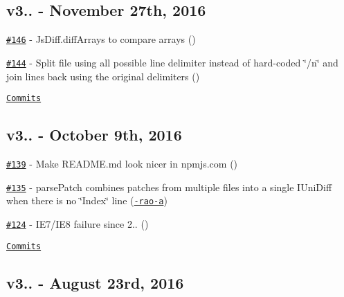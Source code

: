 \subsection*{v3.. -\/ November 27th, 2016}


\begin{DoxyItemize}
\item \href{https://github.com/kpdecker/jsdiff/pull/146}{\tt \#146} -\/ Js\+Diff.\+diff\+Arrays to compare arrays (\href{https://api.github.com/users/wvanderdeijl}{\tt })
\item \href{https://github.com/kpdecker/jsdiff/pull/144}{\tt \#144} -\/ Split file using all possible line delimiter instead of hard-\/coded \char`\"{}/n\char`\"{} and join lines back using the original delimiters (\href{https://api.github.com/users/soulbeing}{\tt })
\end{DoxyItemize}

\href{https://github.com/kpdecker/jsdiff/compare/v3.0.1...v3.1.0}{\tt Commits}

\subsection*{v3.. -\/ October 9th, 2016}


\begin{DoxyItemize}
\item \href{https://github.com/kpdecker/jsdiff/pull/139}{\tt \#139} -\/ Make R\+E\+A\+D\+M\+E.\+md look nicer in npmjs.\+com (\href{https://api.github.com/users/takenspc}{\tt })
\item \href{https://github.com/kpdecker/jsdiff/issues/135}{\tt \#135} -\/ parse\+Patch combines patches from multiple files into a single I\+Uni\+Diff when there is no \char`\"{}\+Index\char`\"{} line (\href{https://api.github.com/users/ramya-rao-a}{\tt -\/rao-\/a})
\item \href{https://github.com/kpdecker/jsdiff/issues/124}{\tt \#124} -\/ I\+E7/\+I\+E8 failure since 2.. (\href{https://api.github.com/users/boneskull}{\tt })
\end{DoxyItemize}

\href{https://github.com/kpdecker/jsdiff/compare/v3.0.0...v3.0.1}{\tt Commits}

\subsection*{v3.. -\/ August 23rd, 2016}


